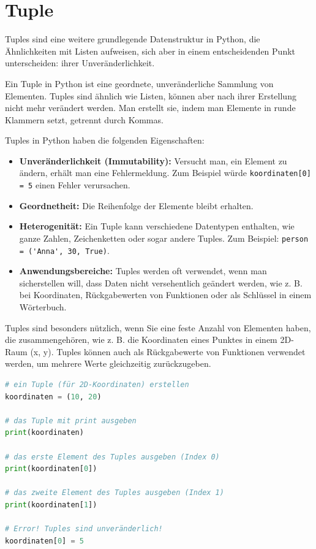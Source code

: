 \section{Tuple}
Tuples sind eine weitere grundlegende Datenstruktur in Python, die Ähnlichkeiten mit Listen aufweisen, sich aber in einem entscheidenden Punkt unterscheiden: ihrer Unveränderlichkeit.

\begin{mydefinition}
	Ein Tuple in Python ist eine geordnete, unveränderliche Sammlung von Elementen.
	Tuples sind ähnlich wie Listen, können aber nach ihrer Erstellung nicht mehr verändert werden.
	Man erstellt sie, indem man Elemente in runde Klammern setzt, getrennt durch Kommas.
\end{mydefinition}

Tuples in Python haben die folgenden Eigenschaften:
\begin{itemize}
	\item \textbf{Unveränderlichkeit (Immutability):} Versucht man, ein Element zu ändern, erhält man eine Fehlermeldung. Zum Beispiel würde \lstinline|koordinaten[0] = 5| einen Fehler verursachen.
	\item \textbf{Geordnetheit:} Die Reihenfolge der Elemente bleibt erhalten.
	\item \textbf{Heterogenität:} Ein Tuple kann verschiedene Datentypen enthalten, wie ganze Zahlen, Zeichenketten oder sogar andere Tuples. Zum Beispiel: \lstinline|person = ('Anna', 30, True)|.
	\item \textbf{Anwendungsbereiche:} Tuples werden oft verwendet, wenn man sicherstellen will, dass Daten nicht versehentlich geändert werden, wie z. B. bei Koordinaten, Rückgabewerten von Funktionen oder als Schlüssel in einem Wörterbuch.
\end{itemize}

Tuples sind besonders nützlich, wenn Sie eine feste Anzahl von Elementen haben, die zusammengehören, wie z. B. die Koordinaten eines Punktes in einem 2D-Raum (x, y). Tuples können auch als Rückgabewerte von Funktionen verwendet werden, um mehrere Werte gleichzeitig zurückzugeben.

\begin{myexample}
	\leavevmode
	\begin{lstlisting}[language=Python]
# ein Tuple (für 2D-Koordinaten) erstellen
koordinaten = (10, 20)

# das Tuple mit print ausgeben
print(koordinaten)

# das erste Element des Tuples ausgeben (Index 0)
print(koordinaten[0])

# das zweite Element des Tuples ausgeben (Index 1)
print(koordinaten[1])

# Error! Tuples sind unveränderlich!
koordinaten[0] = 5
\end{lstlisting}
\end{myexample}

